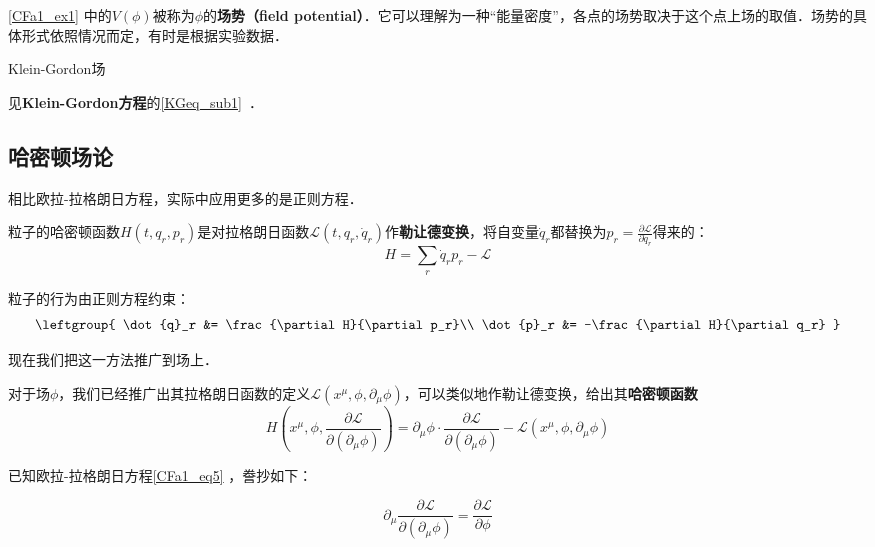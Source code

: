 \autoref{CFa1_ex1} 中的$V(\phi)$被称为$\phi$的\textbf{场势（field potential）}．它可以理解为一种“能量密度”，各点的场势取决于这个点上场的取值．场势的具体形式依照情况而定，有时是根据实验数据．



\begin{example}{Klein-Gordon场}

见\textbf{Klein-Gordon方程}的\autoref{KGeq_sub1}~．

\end{example}




\subsection{哈密顿场论}


相比欧拉-拉格朗日方程，实际中应用更多的是正则方程．

粒子的哈密顿函数$H(t, q_r, p_r)$是对拉格朗日函数$\mathcal{L}(t, q_r, \dot{q}_r)$作\textbf{勒让德变换}，将自变量$\dot{q}_r$都替换为$p_r=\frac{\partial \mathcal{L}}{\partial \dot{q}_r}$得来的：
\begin{equation}
H = \sum_r \dot{q}_rp_r-\mathcal{L}
\end{equation}

粒子的行为由正则方程约束：
\begin{equation}
\leftgroup{
    \dot{q}_r &= \frac{\partial H}{\partial p_r}\\
    \dot{p}_r &= -\frac{\partial H}{\partial q_r}
}
\end{equation}

现在我们把这一方法推广到场上．

对于场$\phi$，我们已经推广出其拉格朗日函数的定义$\mathcal{\mathcal{L}}(x^\mu, \phi, \partial_\mu\phi)$，可以类似地作勒让德变换，给出其\textbf{哈密顿函数}
\begin{equation}
H(x^\mu, \phi, \frac{\partial \mathcal{L}}{\partial (\partial_\mu\phi)}) = \partial_\mu\phi\cdot\frac{\partial \mathcal{\mathcal{L}}}{\partial (\partial_\mu\phi)}-\mathcal{L}(x^\mu, \phi, \partial_\mu\phi)
\end{equation}

已知欧拉-拉格朗日方程\autoref{CFa1_eq5} ，誊抄如下：

\begin{equation}
\partial_\mu \frac{\partial\mathcal{L}}{\partial(\partial_\mu \phi)} = \frac{\partial\mathcal{L}}{\partial \phi}
\end{equation}

